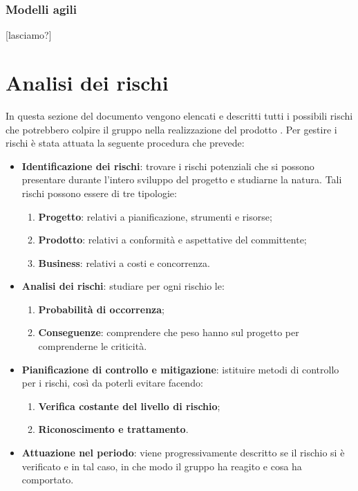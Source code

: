 		\subsubsection{Modelli agili}
[lasciamo?]



\section{Analisi dei rischi}
In questa sezione del documento vengono elencati e descritti tutti i possibili rischi che potrebbero colpire il gruppo \hx{} nella realizzazione del prodotto \proj. Per gestire i rischi è stata attuata la seguente procedura che prevede:
\begin{itemize}
	\item \textbf{Identificazione dei rischi}: trovare i rischi potenziali che si possono presentare durante l'intero sviluppo del progetto e studiarne la natura. Tali rischi possono essere di tre tipologie:
	\begin{enumerate}
		\item \textbf{Progetto}: relativi a pianificazione, strumenti e risorse;
		\item \textbf{Prodotto}: relativi a conformità e aspettative del committente;
		\item \textbf{Business}: relativi a costi e concorrenza.
	\end{enumerate}
	\item \textbf{Analisi dei rischi}: studiare per ogni rischio le:
	\begin{enumerate}
		\item \textbf{Probabilità di occorrenza};
		\item \textbf{Conseguenze}: comprendere che peso hanno sul progetto per comprenderne le criticità.
	\end{enumerate}
	\item \textbf{Pianificazione di controllo e mitigazione}: istituire metodi di controllo per i rischi, così da poterli evitare facendo:
	\begin{enumerate}
		\item \textbf{Verifica costante del livello di rischio};
		\item \textbf{Riconoscimento e trattamento}.
	\end{enumerate}
	\item \textbf{Attuazione nel periodo}: viene progressivamente descritto se il rischio si è verificato e in tal caso, in che modo il gruppo ha reagito e cosa ha comportato.
\end{itemize}
